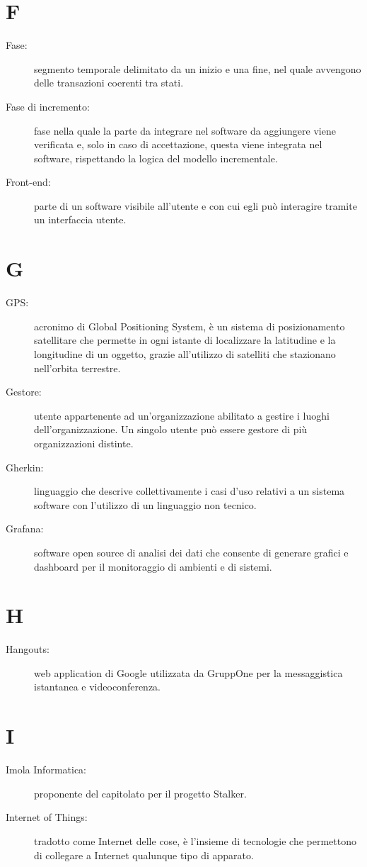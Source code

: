 \documentclass{article}
\begin{document}
	\section{F}
	\begin{description}
		\item[Fase:] segmento temporale delimitato da un inizio e una fine, nel quale avvengono delle transazioni coerenti tra stati.
		\item[Fase di incremento:] fase nella quale la parte da integrare nel software da aggiungere viene verificata e, solo in caso di accettazione, questa viene integrata nel software, rispettando la logica del modello incrementale.
		\item[Front-end:] parte di un software visibile all'utente e con cui egli può interagire tramite un interfaccia utente.
	\end{description}
	\newpage
	\section{G}
	\begin{description}
		\item[GPS:] acronimo di Global Positioning System, è un sistema di posizionamento satellitare che permette in ogni istante di localizzare la latitudine e la longitudine di un oggetto, grazie all'utilizzo di satelliti che stazionano nell'orbita terrestre.
		\item[Gestore:] utente appartenente ad un'organizzazione abilitato a gestire i luoghi dell'organizzazione. Un singolo utente può essere gestore di più organizzazioni distinte.
		\item[Gherkin:] linguaggio che descrive collettivamente i casi d'uso relativi a un sistema software con l'utilizzo di un linguaggio non tecnico.
		\item[Grafana:] software open source di analisi dei dati che consente di generare grafici e dashboard per il monitoraggio di ambienti e di sistemi.
	\end{description}
	\newpage
	\section{H}
	\begin{description}
		\item[Hangouts:] web application di Google utilizzata da GruppOne per la messaggistica istantanea e videoconferenza.
	\end{description}
	\newpage
	\section{I}
	\begin{description}
		\item[Imola Informatica:] proponente del capitolato per il progetto Stalker.
		\item[Internet of Things:] tradotto come Internet delle cose, è l'insieme di tecnologie che permettono di collegare a Internet qualunque tipo di apparato.
	\end{description}
	\newpage
\end{document}
